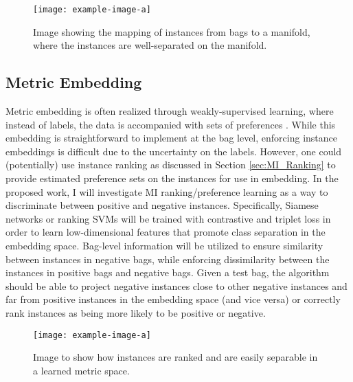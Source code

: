 \begin{center}
	\begin{figure*}[h]
		\centering
		\texttt{[image: example-image-a]}
		\caption[Proposed manifold learning]{Image showing the mapping of instances from bags to a manifold, where the instances are well-separated  on the manifold.}
		\label{fig:proposed_manifold_learning}
	\end{figure*}
\end{center}

\subsection{Metric Embedding}
Metric embedding is often realized through weakly-supervised learning, where instead of labels, the data is accompanied with sets of preferences \citep{Hermans2017DefenseTripletLoss,Koch2015SiameseNetworks,Schroff2015FaceNet}. While this embedding is straightforward to implement at the bag level, enforcing instance embeddings is difficult due to the uncertainty on the labels.  However, one could (potentially) use instance ranking as discussed in Section \ref{sec:MI_Ranking} to provide estimated preference sets on the instances for use in embedding.  In the proposed work, I will investigate MI ranking/preference learning as a way to discriminate between positive and negative instances.  Specifically, Siamese networks or ranking SVMs will be trained with contrastive and triplet loss in order to learn low-dimensional features that promote class separation in the embedding space.  Bag-level information will be utilized to ensure similarity between instances in negative bags, while enforcing dissimilarity between the instances in positive bags and negative bags.  Given a test bag, the algorithm should be able to project negative instances close to other negative instances and far from positive instances in the embedding space (and vice versa) or correctly rank instances as being more likely to be positive or negative.

\begin{center}
	\begin{figure*}[h]
		\centering
		\texttt{[image: example-image-a]}
		\caption[Proposed metric embedding]{Image to show how instances are ranked and are easily separable in a learned metric space.}
		\label{fig:proposed_metric_embedding}
	\end{figure*}
\end{center}

